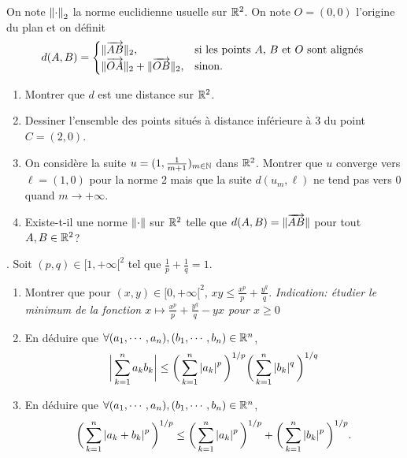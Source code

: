 \documentclass{tp_um}
\begin{document}
\newpage
{} On note $\left\lVert\cdot\right\rVert_2$ la norme euclidienne usuelle sur $\mathbb{R}^2$. On
note $O=(0,0)$ l'origine du plan et on définit
\[
	d(A,B) = \begin{cases}
		\lVert\overrightarrow{AB}\rVert_2, &\text{si les points $A$, $B$ et $O$ sont alignés  } \\
		\lVert\overrightarrow{OA}\rVert_2 + \lVert\overrightarrow{OB}\rVert_2, &\text{sinon.}
	\end{cases}
\]
\begin{enumerate}
	\item Montrer que $d$ est une distance sur $\mathbb{R}^2$.
	\item Dessiner l'ensemble des points situés à distance inférieure à 3 du point $C = (2,0)$.
	\item On considère la suite $u = ( 1, \frac{1}{m+1})_{m\in\mathbb{N}}$ dans $\mathbb{R}^2$. Montrer que $u$ converge vers $\ell=(1,0)$ pour la norme $2$ mais que la suite $d(u_m,\ell)$ ne tend pas vers 0 quand $m \to +\infty$.
	\item Existe-t-il une norme $\lVert\cdot\rVert$ sur $\mathbb{R}^2$ telle que $d(A,B) = \lVert\overrightarrow{AB}\rVert$ pour tout $A,B\in\mathbb{R}^2$? 
\end{enumerate}


\newpage

%
%
%
. 
Soit $(p,q)\in [1,+\infty[^2$ tel que $\frac{1}{p}+\frac{1}{q}=1$.
        \begin{enumerate}
                \item Montrer que pour $(x,y) \in [0,+\infty[^2$, $xy \leq \frac{x^p}{p}+ \frac{y^q}{q}$.
                                {\it Indication: étudier le minimum de la fonction $x\mapsto \frac{x^p}{p} + \frac{y^q}{q} -yx$ pour $x\geq 0$}
                \item En déduire que $\forall (a_1,\cdots,a_n),(b_1,\cdots,b_n)\in \mathbb{R}^n$, 
                        \[
                                \bigg\lvert \sum_{k=1}^n a_kb_k\bigg\rvert \leq \bigg(\sum_{k=1}^n \left\lvert a_k\right\rvert^p\bigg)^{1/p}\bigg(\sum_{k=1}^n \left\lvert b_k\right\rvert^q\bigg)^{1/q}
                        \]
                \item 	En déduire que $\forall (a_1,\cdots,a_n),(b_1,\cdots,b_n) \in \mathbb{R}^n$, 
                        \[
                                \bigg(\sum^n_{k=1}\left\lvert a_k+b_k\right\rvert^p\bigg)^{1/p}\leq\bigg(\sum^n_{k=1}\left\lvert a_k\right\rvert^p\bigg)^{1/p}+\bigg(\sum^n_{k=1}\left\lvert b_k\right\rvert^p\bigg)^{1/p}.
        \]
                \end{enumerate}
\end{document}
